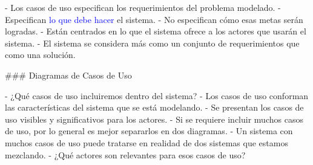 
- Los casos de uso especifican los requerimientos del problema modelado.
- Especifican \textcolor{blue}{lo que debe hacer} el sistema.
- No especifican cómo esas metas serán logradas.
- Están centrados en lo que el sistema ofrece a los actores que usarán el sistema.
- El sistema se considera más como un conjunto de requerimientos que como una solución.

### Diagramas de Casos de Uso


- ¿Qué casos de uso incluiremos dentro del sistema?
    - Los casos de uso conforman las características del sistema que se está modelando.
    - Se presentan los casos de uso visibles y significativos para los actores.
    - Si se requiere incluir muchos casos de uso, por lo general es mejor separarlos en dos diagramas.
    - Un sistema con muchos casos de uso puede tratarse en realidad de dos sistemas que estamos mezclando.
- ¿Qué actores son relevantes para esos casos de uso?

